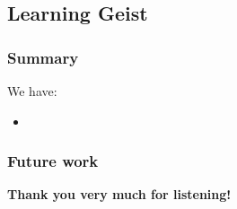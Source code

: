 \documentclass[xcolor=x11names,compress]{beamer}
\renewcommand{\(}{\begin{columns}}
\renewcommand{\)}{\end{columns}}
\newcommand{\<}[1]{\begin{column}{#1}}
\renewcommand{\>}{\end{column}}
\begin{document}
\subsection{Learning Geist}
\begin{frame}
\frametitle{}


\end{frame}




\begin{frame}
\frametitle{Summary}

We have:
\begin{itemize}
\item{}
\end{itemize}

\end{frame}

\begin{frame}
\frametitle{Future work}

\begin{center}
\textbf{Thank you very much for listening!}
\end{center}

\end{frame}
\end{document}
